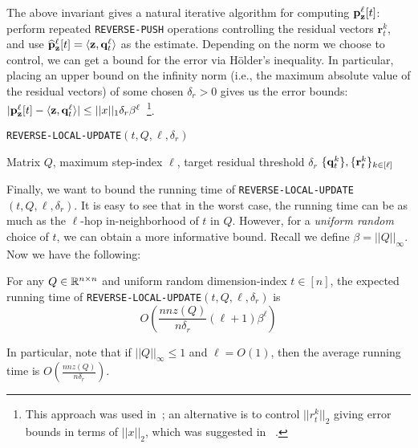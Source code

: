 The above invariant gives a natural iterative algorithm for computing ${\mathbf{p}}_\mathbf{z}^{\ell}[t]$: perform repeated \texttt{REVERSE-PUSH} operations controlling the residual vectors $\mathbf{r}_t^k$, and use $\widehat{\mathbf{p}}_\mathbf{z}^{\ell}[t] = \langle\mathbf{z},\mathbf{q}_t^{\ell}\rangle$ as the estimate. 
Depending on the norm we choose to control, we can get a bound for the error via H{\"o}lder's inequality.
In particular, placing an upper bound on the infinity norm (i.e., the maximum absolute value of the residual vectors) of some chosen $\delta_r>0$ gives us the error bounds: $|{\mathbf{p}}_\mathbf{z}^{\ell}[t] - \langle\mathbf{z},\mathbf{q}_t^{\ell}\rangle|\leq ||x||_1\delta_r\beta^{\ell}$~\footnote{This approach was used in~\cite{andersen2007local,Lofgren2014,banerjee2015fast}; an alternative is to control $||r_t^k||_2$ giving error bounds in terms of $||x||_2$, which was suggested in ~\cite{lee2014asynchronous}.}.

\begin{algorithm}[ht]
\caption{\texttt{REVERSE-LOCAL-UPDATE}$(t,Q, \ell, \delta_r)$}
\label{alg:rwork}
\begin{algorithmic}[1]
\REQUIRE Matrix $Q$, maximum step-index $\ell$, target residual threshold $\delta_r$
\ENDWHILE
\ENDFOR
\RETURN $\{\mathbf{q}^{k}_t\}, \{\mathbf{r}^{k}_t\}_{k \in[\ell]}$
\end{algorithmic}
\end{algorithm}    

Finally, we want to bound the running time of \texttt{REVERSE-LOCAL-UPDATE}$(t,Q,\ell,\delta_r)$. 
It is easy to see that in the worst case, the running time can be as much as the $\ell$-hop in-neighborhood of $t$ in $Q$. 
However, for a \emph{uniform random} choice of $t$, we can obtain a more informative bound. 
Recall we define $\beta =  ||Q||_{\infty}$. Now we have the following:

\begin{lemma}
\label{lem:pushruntime}
For any $Q\in\mathbb{R}^{n\times n}$ and uniform random dimension-index $t\in[n]$, the expected running time of \texttt{REVERSE-LOCAL-UPDATE}$(t,Q,\ell,\delta_r)$ is 
$$O\left(\frac{nnz(Q)}{n\delta_r}(\ell+1)\beta^{\ell}\right)$$ 
\end{lemma}

In particular, note that if $||Q||_{\infty}\leq 1$ and $\ell=O(1)$, then the average running time is $O\left(\frac{nnz(Q)}{n\delta_r}\right)$.

